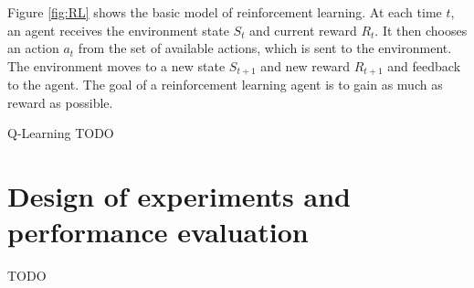\documentclass[a4paper]{article}
\begin{document}
Figure \ref{fig:RL} shows the basic model of reinforcement learning. At each time $t$, an agent
receives the environment state $S_t$ and current reward $R_t$. It then chooses an action $a_t$
from the set of available actions, which is sent to the environment. The environment moves
to a new state $S_{t+1}$ and new reward $R_{t+1}$ and feedback to the agent. The goal of a
reinforcement learning agent is to gain as much as reward as possible.


Q-Learning
TODO

\section{Design of experiments and performance evaluation}

TODO



%
\end{document}

